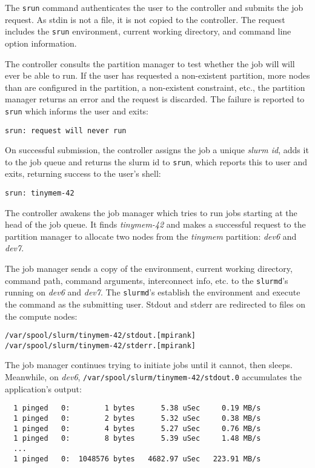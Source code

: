 The {\tt srun} command authenticates the user to the controller and submits
the job request.  As stdin is not a file, it is not copied to the controller.
The request includes the {\tt srun} environment, current working directory, 
and command line option information.

The controller consults the partition manager to test whether the job will
will ever be able to run.  If the user has requested a non-existent partition,
more nodes than are configured in the partition, a non-existent constraint, 
etc., the partition manager returns an error and the request is discarded.
The failure is reported to {\tt srun} which informs the user and exits:
\begin{verbatim}
srun: request will never run
\end{verbatim}

On successful submission, the controller assigns the job a unique 
{\em slurm id}, adds it to the job queue and returns the 
slurm id to {\tt srun}, which reports this to user and exits, returning
success to the user's shell:

\begin{verbatim}
srun: tinymem-42
\end{verbatim}

The controller awakens the job manager which tries to run
jobs starting at the head of the job queue.  It finds {\em tinymem-42}
and makes a successful request to the partition manager to allocate 
two nodes from the {\em tinymem} partition: {\em dev6} and {\em dev7}.

The job manager sends a copy of the environment, current working directory,
command path, command arguments, interconnect info, etc.
to the {\tt slurmd}'s running on {\em dev6} and {\em dev7}.  
The {\tt slurmd}'s establish the environment and execute the command as 
the submitting user.  Stdout and stderr are redirected to files on the 
compute nodes:

\begin{verbatim}
/var/spool/slurm/tinymem-42/stdout.[mpirank]
/var/spool/slurm/tinymem-42/stderr.[mpirank]
\end{verbatim}

The job manager continues trying to initiate jobs until it cannot, then sleeps.
Meanwhile, on {\em dev6}, {\tt /var/spool/slurm/tinymem-42/stdout.0}
accumulates the application's output:

\begin{verbatim}
  1 pinged   0:        1 bytes      5.38 uSec     0.19 MB/s                     
  1 pinged   0:        2 bytes      5.32 uSec     0.38 MB/s                     
  1 pinged   0:        4 bytes      5.27 uSec     0.76 MB/s                     
  1 pinged   0:        8 bytes      5.39 uSec     1.48 MB/s                     
  ...
  1 pinged   0:  1048576 bytes   4682.97 uSec   223.91 MB/s              
\end{verbatim}

